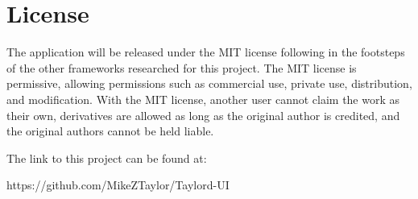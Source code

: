 \section*{License}
The application will be released under the MIT license following in the footsteps of the other frameworks researched for this project. The MIT license is permissive, allowing permissions such as commercial use, private use, distribution, and modification. With the MIT license, another user cannot claim the work as their own, derivatives are allowed as long as the original author is credited, and the original authors cannot be held liable.

The link to this project can be found at:

https://github.com/MikeZTaylor/Taylord-UI
